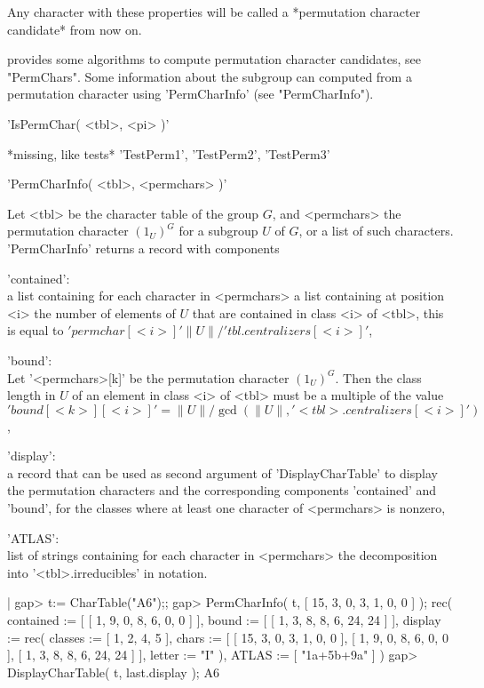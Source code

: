 Any  character with  these  properties   will be called   a  *permutation
character candidate* from now on.

{\GAP}    provides some  algorithms   to   compute permutation  character
candidates, see  "PermChars".  Some  information  about the  subgroup can
computed   from  a    permutation character using    'PermCharInfo'  (see
"PermCharInfo").

%
%
%

'IsPermChar( <tbl>, <pi> )'

*missing, like tests* 'TestPerm1', 'TestPerm2', 'TestPerm3'

%

'PermCharInfo( <tbl>, <permchars> )'

Let <tbl>  be the character table of  the group $G$, and  <permchars> the
permutation character  $(1_U)^G$ for a subgroup $U$  of $G$, or a list of
such characters.  'PermCharInfo' returns a record with components

'contained':\\
  a list containing for each character in <permchars> a list containing
  at position <i> the number of elements of $U$ that are contained in
  class <i> of <tbl>, this is equal to
  $'permchar[<i>]' \|U\| / 'tbl.centralizers[<i>]'$,

'bound':\\
  Let '<permchars>[k]' be the permutation character $(1_U)^G$.  Then the
  class length in $U$ of an element in class <i> of <tbl> must be a
  multiple of the value
  $'bound[<k>][<i>]' = \|U\| / \gcd( \|U\|, '<tbl>.centralizers[<i>]' )$,

'display':\\
  a record that can be used as second argument of 'DisplayCharTable'
  to display the permutation characters and the corresponding components
  'contained' and 'bound', for the classes where at least one character
  of <permchars> is nonzero,

'ATLAS':\\
  list of strings containing for each character in <permchars> the
  decomposition into '<tbl>.irreducibles' in {\ATLAS} notation.

|    gap> t:= CharTable("A6");;
    gap> PermCharInfo( t, [ 15, 3, 0, 3, 1, 0, 0 ] );
    rec(
      contained := [ [ 1, 9, 0, 8, 6, 0, 0 ] ],
      bound := [ [ 1, 3, 8, 8, 6, 24, 24 ] ],
      display := rec(
          classes := [ 1, 2, 4, 5 ],
          chars := [ [ 15, 3, 0, 3, 1, 0, 0 ], [ 1, 9, 0, 8, 6, 0, 0 ],
              [ 1, 3, 8, 8, 6, 24, 24 ] ],
          letter := "I" ),
      ATLAS := [ "1a+5b+9a" ] )
    gap> DisplayCharTable( t, last.display );
    A6

